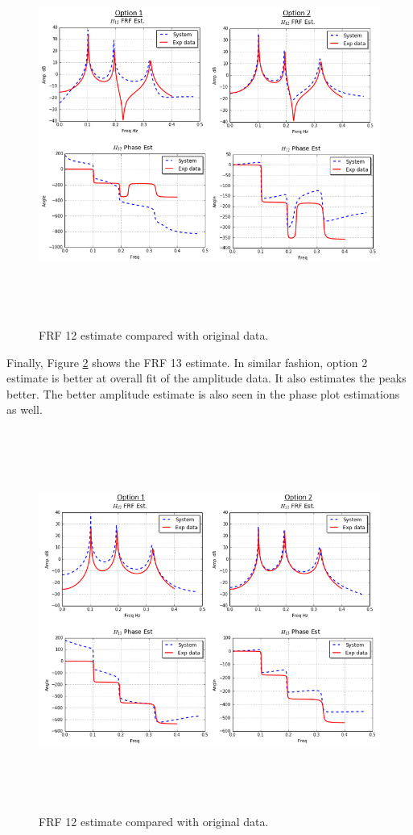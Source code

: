 \documentclass[paper=a4, fontsize=12pt]{scrartcl} %
\begin{document}
\begin{figure}[H]
	\centering
	\includegraphics[height = 12.5cm]{H12EstBoth.png}
	\caption{FRF 12 estimate compared with original data.}
	\label{fig:H12EstBoth}
\end{figure}
%
Finally, Figure \ref{fig:H13EstBoth} shows the FRF 13 estimate. In similar fashion, option 2 estimate is better at overall fit of the amplitude data. It also estimates the peaks better. The better amplitude estimate is also seen in the phase plot estimations as well.
%
\begin{figure}[H]
	\centering
	\includegraphics[height = 12.5cm]{H13EstBoth.png}
	\caption{FRF 12 estimate compared with original data.}
	\label{fig:H13EstBoth}
\end{figure}
\end{document}
